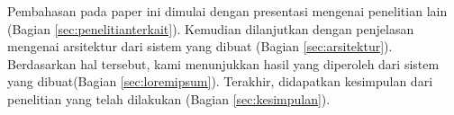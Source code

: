 Pembahasan pada paper ini dimulai dengan presentasi mengenai penelitian lain (Bagian \ref{sec:penelitianterkait}).
Kemudian dilanjutkan dengan penjelasan mengenai arsitektur dari sistem yang dibuat (Bagian \ref{sec:arsitektur}).
Berdasarkan hal tersebut, kami menunjukkan hasil yang diperoleh dari sistem yang dibuat(Bagian \ref{sec:loremipsum}).
Terakhir, didapatkan kesimpulan dari penelitian yang telah dilakukan (Bagian \ref{sec:kesimpulan}).
